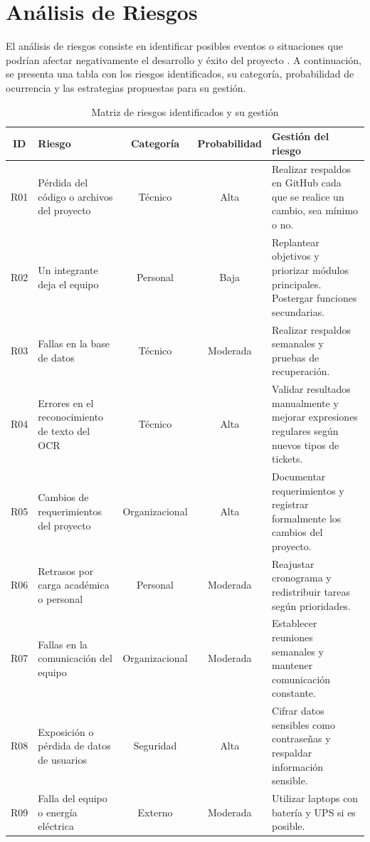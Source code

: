 \section{Análisis de Riesgos}
El análisis de riesgos consiste en identificar posibles eventos o situaciones que podrían afectar negativamente el desarrollo y éxito del proyecto \cite{AnalisisRiesgos}. 
A continuación, se presenta una tabla con los riesgos identificados, su categoría, probabilidad de ocurrencia y las estrategias propuestas para su gestión.

\begin{table}[H]
\centering
\small
\renewcommand{\arraystretch}{1.3}
\setlength{\tabcolsep}{4pt}
\begin{tabularx}{\textwidth}{|c|X|c|c|X|}
\hline
\textbf{ID} & \textbf{Riesgo} & \textbf{Categoría} & \textbf{Probabilidad} & \textbf{Gestión del riesgo} \\
\hline
R01 & Pérdida del código o archivos del proyecto & Técnico & Alta & Realizar respaldos en GitHub cada que se realice un cambio, sea mínimo o no. \\
\hline
R02 & Un integrante deja el equipo & Personal & Baja & Replantear objetivos y priorizar módulos principales. Postergar funciones secundarias. \\
\hline
R03 & Fallas en la base de datos & Técnico & Moderada & Realizar respaldos semanales y pruebas de recuperación. \\
\hline
R04 & Errores en el reconocimiento de texto del OCR & Técnico & Alta & Validar resultados manualmente y mejorar expresiones regulares según nuevos tipos de tickets. \\
\hline
R05 & Cambios de requerimientos del proyecto & Organizacional & Alta & Documentar requerimientos y registrar formalmente los cambios del proyecto. \\
\hline
R06 & Retrasos por carga académica o personal & Personal & Moderada & Reajustar cronograma y redistribuir tareas según prioridades. \\
\hline
R07 & Fallas en la comunicación del equipo & Organizacional & Moderada & Establecer reuniones semanales y mantener comunicación constante. \\
\hline
R08 & Exposición o pérdida de datos de usuarios & Seguridad & Alta & Cifrar datos sensibles como contraseñas y respaldar información sensible. \\
\hline
R09 & Falla del equipo o energía eléctrica & Externo & Moderada & Utilizar laptops con batería  y UPS si es posible. \\
\hline
\end{tabularx}
\caption{Matriz de riesgos identificados y su gestión}
\label{tab:riesgos}
\end{table}
